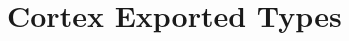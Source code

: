\hypertarget{group___c_o_r_t_e_x___exported___types}{\section{Cortex Exported Types}
\label{group___c_o_r_t_e_x___exported___types}
}

